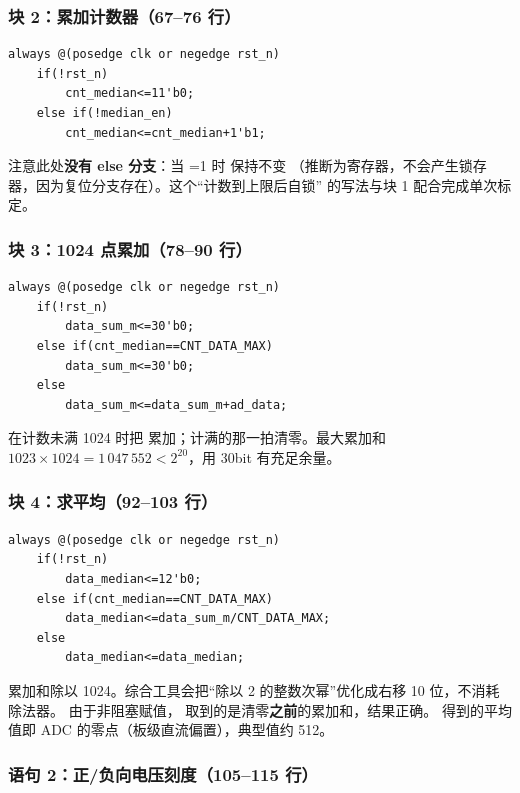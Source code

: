 \subsubsection{块 2：累加计数器（67--76 行）}

\begin{lstlisting}[style=vsnip]
always @(posedge clk or negedge rst_n)
    if(!rst_n)
        cnt_median<=11'b0;
    else if(!median_en)
        cnt_median<=cnt_median+1'b1;
\end{lstlisting}

注意此处\textbf{没有 else 分支}：当 =1 时  保持不变
（推断为寄存器，不会产生锁存器，因为复位分支存在）。这个“计数到上限后自锁”
的写法与块 1 配合完成单次标定。

\subsubsection{块 3：1024 点累加（78--90 行）}

\begin{lstlisting}[style=vsnip]
always @(posedge clk or negedge rst_n)
    if(!rst_n)
        data_sum_m<=30'b0;
    else if(cnt_median==CNT_DATA_MAX)
        data_sum_m<=30'b0;
    else
        data_sum_m<=data_sum_m+ad_data;
\end{lstlisting}

在计数未满 1024 时把  累加；计满的那一拍清零。最大累加和
$1023\times1024=1\,047\,552<2^{20}$，用 30bit 有充足余量。

\subsubsection{块 4：求平均（92--103 行）}

\begin{lstlisting}[style=vsnip]
always @(posedge clk or negedge rst_n)
    if(!rst_n)
        data_median<=12'b0;
    else if(cnt_median==CNT_DATA_MAX)
        data_median<=data_sum_m/CNT_DATA_MAX;
    else
        data_median<=data_median;
\end{lstlisting}

累加和除以 1024。综合工具会把“除以 2 的整数次幂”优化成右移 10 位，不消耗除法器。
由于非阻塞赋值， 取到的是清零\textbf{之前}的累加和，结果正确。
得到的平均值即 ADC 的零点（板级直流偏置），典型值约 512。

\subsubsection{语句 2：正/负向电压刻度（105--115 行）}


